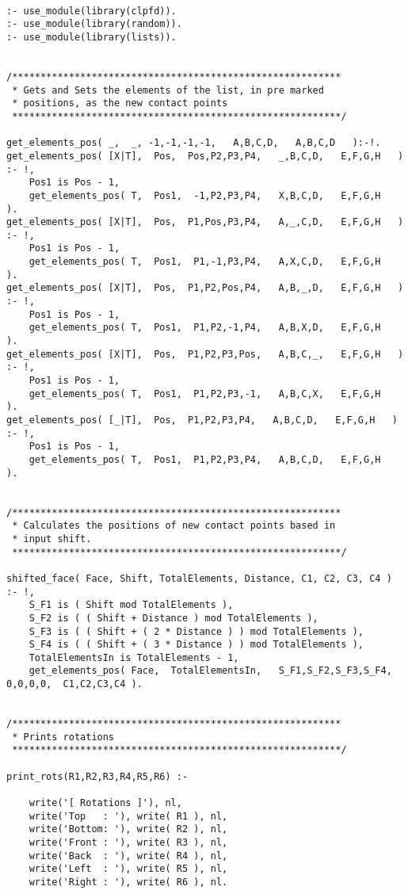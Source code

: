 \begin{lstlisting}

:- use_module(library(clpfd)).
:- use_module(library(random)).
:- use_module(library(lists)).


/**********************************************************
 * Gets and Sets the elements of the list, in pre marked
 * positions, as the new contact points
 **********************************************************/
 
get_elements_pos( _,  _, -1,-1,-1,-1,   A,B,C,D,   A,B,C,D   ):-!.
get_elements_pos( [X|T],  Pos,  Pos,P2,P3,P4,   _,B,C,D,   E,F,G,H   ) :- !,
	Pos1 is Pos - 1,
	get_elements_pos( T,  Pos1,  -1,P2,P3,P4,   X,B,C,D,   E,F,G,H   ).
get_elements_pos( [X|T],  Pos,  P1,Pos,P3,P4,   A,_,C,D,   E,F,G,H   ) :- !,
	Pos1 is Pos - 1,
	get_elements_pos( T,  Pos1,  P1,-1,P3,P4,   A,X,C,D,   E,F,G,H   ).
get_elements_pos( [X|T],  Pos,  P1,P2,Pos,P4,   A,B,_,D,   E,F,G,H   ) :- !,
	Pos1 is Pos - 1,
	get_elements_pos( T,  Pos1,  P1,P2,-1,P4,   A,B,X,D,   E,F,G,H   ).
get_elements_pos( [X|T],  Pos,  P1,P2,P3,Pos,   A,B,C,_,   E,F,G,H   ) :- !,
	Pos1 is Pos - 1,
	get_elements_pos( T,  Pos1,  P1,P2,P3,-1,   A,B,C,X,   E,F,G,H   ).
get_elements_pos( [_|T],  Pos,  P1,P2,P3,P4,   A,B,C,D,   E,F,G,H   ) :- !,
	Pos1 is Pos - 1,
	get_elements_pos( T,  Pos1,  P1,P2,P3,P4,   A,B,C,D,   E,F,G,H   ).

	
/**********************************************************
 * Calculates the positions of new contact points based in
 * input shift.
 **********************************************************/

shifted_face( Face, Shift, TotalElements, Distance, C1, C2, C3, C4 ) :- !,
	S_F1 is ( Shift mod TotalElements ),
	S_F2 is ( ( Shift + Distance ) mod TotalElements ),
	S_F3 is ( ( Shift + ( 2 * Distance ) ) mod TotalElements ),
	S_F4 is ( ( Shift + ( 3 * Distance ) ) mod TotalElements ),
	TotalElementsIn is TotalElements - 1,
	get_elements_pos( Face,  TotalElementsIn,   S_F1,S_F2,S_F3,S_F4,  0,0,0,0,  C1,C2,C3,C4 ).

	
/**********************************************************
 * Prints rotations
 **********************************************************/
	
print_rots(R1,R2,R3,R4,R5,R6) :-

	write('[ Rotations ]'), nl,
	write('Top   : '), write( R1 ), nl,
	write('Bottom: '), write( R2 ), nl,
	write('Front : '), write( R3 ), nl,
	write('Back  : '), write( R4 ), nl,
	write('Left  : '), write( R5 ), nl,
	write('Right : '), write( R6 ), nl.


\end{lstlisting}
